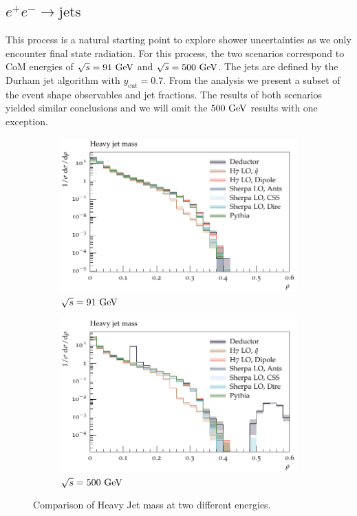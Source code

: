 \subsection{$e^+e^-\to\text{jets}$}
\label{sec:psunc:results:ee}
This process is a natural starting point to explore shower uncertainties as we
only encounter final state radiation. For this process, the two scenarios
correspond to CoM energies of $\sqrt{s}=91~\textrm{GeV}$ and $\sqrt{s}=500~\textrm{GeV}$. The
jets are defined by the Durham jet algorithm with $y_\mathrm{cut}=0.7$. From
the analysis we present a subset of the event shape observables and jet
fractions. The results of both scenarios yielded similar conclusions and
we will omit the $500~\textrm{GeV}$ results with one exception.
\begin{figure}[h]
  \centering
  \begin{subfigure}[t]{0.49\textwidth}
    \includegraphics[width=\textwidth]{plots/EE-91-MuShower/MC_EETOJETS/HeavyJetMass.pdf}
    \caption{$\sqrt{s} = 91~\textrm{GeV}$}
    \label{fig:ee:heavyjetmass:91}
  \end{subfigure}
  \begin{subfigure}[t]{0.49\textwidth}
    \includegraphics[width=\textwidth]{plots/EE-500-MuShower/MC_EETOJETS/HeavyJetMass.pdf}
    \caption{$\sqrt{s} = 500~\textrm{GeV}$}
    \label{fig:ee:heavyjetmass:500}
  \end{subfigure}
  \caption{Comparison of Heavy Jet mass at two different energies.}
  \label{fig:ee:heavyjetmass}
\end{figure}

